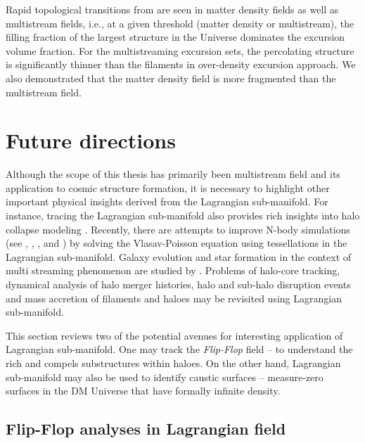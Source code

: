 Rapid topological transitions from are seen in matter density fields as well as multistream fields, i.e., at a given threshold (matter density or multistream), the filling fraction of the largest structure in the Universe dominates the excursion volume fraction. For the multistreaming excursion sets, the percolating structure is significantly thinner than the filaments in over-density excursion approach. We also demonstrated that the matter density field is more fragmented than the multistream field. 
 

\section{Future directions}

Although the scope of this thesis has primarily been multistream field and its application to cosmic structure formation, it is necessary to highlight other important physical insights derived from the Lagrangian sub-manifold. For instance, tracing the Lagrangian sub-manifold also provides rich insights into halo collapse modeling \cite{Neyrinck2016}. Recently, there are attempts to improve N-body simulations (see \cite{Hahn2013}, \cite{Angulo2013a}, \cite{Angulo2013b}, \cite{Sousbie2015} and \cite{Hahn2016a}) by solving the Vlasav-Poisson equation using tessellations in the Lagrangian sub-manifold. Galaxy evolution and star formation in the context of multi streaming phenomenon are studied by \cite{Aragon-Calvo2016}. Problems of halo-core tracking, dynamical analysis of halo merger histories, halo and sub-halo disruption events and mass accretion of filaments and haloes may be revisited using Lagrangian sub-manifold.

This section reviews two of the potential avenues for interesting application of Lagrangian sub-manifold. One may track the {\it Flip-Flop} field -- to understand the rich and compels substructures within haloes. On the other hand, Lagrangian sub-manifold may also be used to identify caustic surfaces -- measure-zero surfaces in the DM Universe that have formally infinite density. 


\subsection{Flip-Flop analyses in Lagrangian field}

